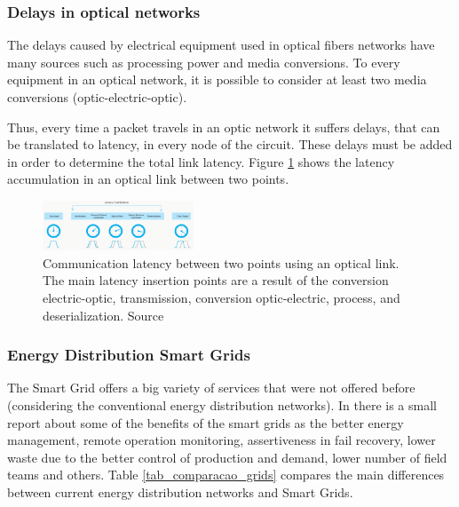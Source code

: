 \documentclass[conference]{IEEEtran}
\begin{document}
\subsubsection{Delays in optical networks}
The delays caused by electrical equipment used in optical fibers networks have many sources such as processing power and media conversions. To every equipment in an optical network, it is possible to consider at least two media conversions (optic-electric-optic).

Thus, every time a packet travels in an optic network it suffers delays, that can be translated to latency, in every node of the circuit. These delays must be added in order to determine the total link latency. Figure \ref{fig_latency_link} shows the latency accumulation in an optical link between two points. 

\begin{figure} [htbp]%
	\centering
	\includegraphics[width=0.4\textwidth]{./figuras/latency-link.png}
	\caption{Communication latency between two points using an optical link. The main latency insertion points are a result of the conversion electric-optic, transmission, conversion optic-electric, process, and deserialization. Source \cite{Art-Coffe2017}}
	\label{fig_latency_link}
\end{figure}

\subsubsection{Energy Distribution Smart Grids}
The Smart Grid offers a big variety of services that were not offered before (considering the conventional energy distribution networks). In \cite{Art-Ma2013} there is a small report about some of the benefits of the smart grids as the better energy management, remote operation monitoring, assertiveness in fail recovery, lower waste due to the better control of production and demand, lower number of field teams and others. Table \ref{tab_comparacao_grids} compares the main differences between current energy distribution networks and Smart Grids.
\end{document}
